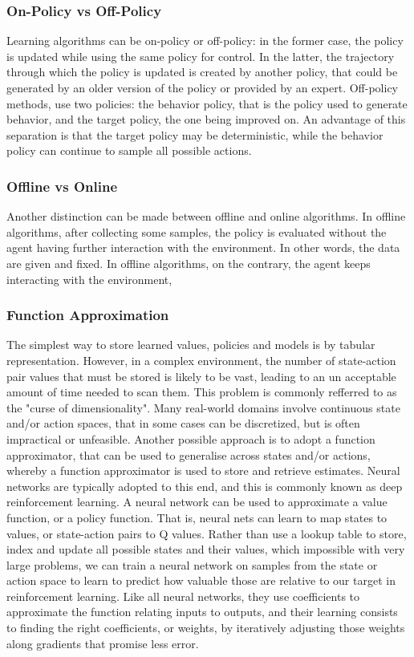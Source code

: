 \subsubsection{On-Policy vs Off-Policy}

Learning algorithms can be on-policy or off-policy: in the former case, the policy is updated while using the same policy for control. In the latter, the trajectory through which the policy is updated is created by another policy, that could be generated by an older version of the policy or provided by an expert.
Off-policy methods, use two policies: the behavior policy, that is the policy used to generate behavior, and the target policy, the one being improved on. An advantage of this separation is that the target policy may be deterministic, while the behavior policy can continue to sample all possible actions.

\subsubsection{Offline vs Online}

Another distinction can be made between offline and online algorithms. In offline algorithms, after collecting some samples, the policy is evaluated without the agent having further interaction with the environment. In other words, the data are given and fixed. In offline algorithms, on the contrary, the agent keeps interacting with the environment,

\subsubsection{Function Approximation}
The simplest way to store learned values, policies and models is by tabular representation. However, in a complex environment, the number of state-action pair values that must be stored is likely to be vast, leading to an un acceptable amount of time needed to scan them. This problem is commonly refferred to as the "curse of dimensionality". Many real-world domains involve continuous state and/or action spaces, that in some cases can be discretized, but is often impractical or unfeasible. Another possible approach is to adopt a function approximator, that can be used to generalise across states and/or actions, whereby a function approximator is used to store and retrieve estimates.
Neural networks are typically adopted to this end, and this is commonly known as deep reinforcement learning.
A neural network can be used to approximate a value function, or a policy function. That is, neural nets can learn to map states to values, or state-action pairs to Q values. Rather than use a lookup table to store, index and update all possible states and their values, which impossible with very large problems, we can train a neural network on samples from the state or action space to learn to predict how valuable those are relative to our target in reinforcement learning.
Like all neural networks, they use coefficients to approximate the function relating inputs to outputs, and their learning consists to finding the right coefficients, or weights, by iteratively adjusting those weights along gradients that promise less error.


